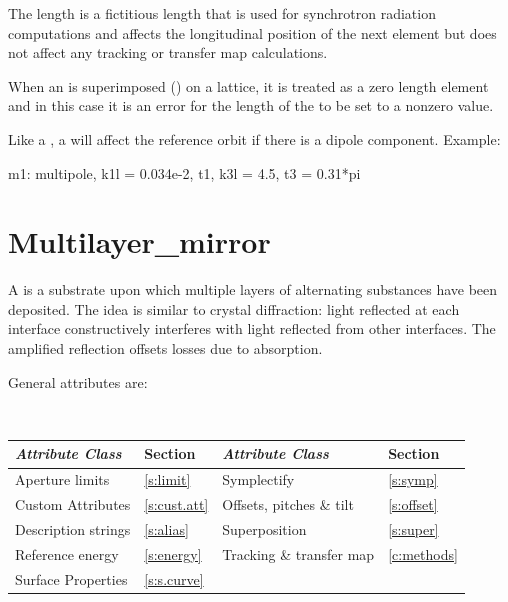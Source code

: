 {
The length  is a fictitious length that is used for synchrotron
radiation computations and affects the longitudinal position of the
next element but does not affect any tracking or transfer map
calculations.

When an  is superimposed () on a lattice, it is
treated as a zero length element and in this case it is an error for the length
of the  to be set to a nonzero value.

Like a \mad {}, a \bmad {} will affect the
reference orbit if there is a dipole component. 
Example:
\begin{example}
  m1: multipole, k1l = 0.034e-2, t1, k3l = 4.5, t3 = 0.31*pi
\end{example}

\section{Multilayer_mirror}
\label{s:multilayer}

A  is a substrate upon which multiple layers
of alternating substances have been deposited. The idea is similar to crystal
diffraction: light reflected at each interface constructively interferes 
with light reflected from other interfaces. The amplified reflection offsets 
losses due to absorption. 

General  attributes are:
\begin{center}
\tt
\begin{tabular}{llll} \toprule
  {\sl Attribute Class}      & Section           & {\sl Attribute Class}      & Section         \\ \midrule
  Aperture limits            & \ref{s:limit}     & Symplectify                & \ref{s:symp}    \\
  Custom Attributes          & \ref{s:cust.att}  & Offsets, pitches \& tilt   & \ref{s:offset}  \\
  Description strings        & \ref{s:alias}     & Superposition              & \ref{s:super}   \\
  Reference energy           & \ref{s:energy}    & Tracking \& transfer map   & \ref{c:methods} \\
  Surface Properties         & \ref{s:s.curve}   &                            &                 \\
  \bottomrule
\end{tabular}
\end{center}
\toffset

}
